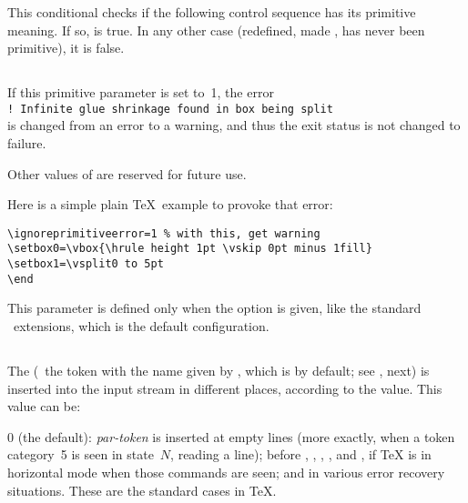 \documentclass{pdftexmanual}
\begin{document}
This conditional checks if the following control sequence has its
primitive meaning. If so,  is true. In any other case
(redefined, made , has never been primitive), it is false.

\subsection{}

If this primitive parameter is set to~1, the error\\
\verb|! Infinite glue shrinkage found in box being split|\\
is changed from an error to a warning, and thus the exit status is not
changed to failure.

Other values of  are reserved for future use.

Here is a simple plain \TeX\ example to provoke that error:

\begin{verbatim}
\ignoreprimitiveerror=1 % with this, get warning
\setbox0=\vbox{\hrule height 1pt \vskip 0pt minus 1fill}
\setbox1=\vsplit0 to 5pt
\end
\end{verbatim}

This parameter is defined only when the  option is given,
like the standard \ETEX\ extensions, which is the default configuration.


\subsection{}

The  (\ie\ the token with the name given by
, which is  by default; see ,
next) is inserted into the input stream in different places, according
to the  value. This value can be:

0 (the default): {\em par-token} is inserted at empty lines (more
   exactly, when a token category~5 is seen in state~$N$, reading a
   line); before , , , , and
   , if \TeX{} is in horizontal mode when those commands are
   seen; and in various error recovery situations. These are the
   standard cases in \TeX.
\end{document}
